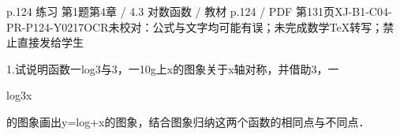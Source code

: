 \begin{bankitem}{p.124 练习 第1题}{第4章 / 4.3 对数函数 / 教材 p.124 / PDF 第131页}{XJ-B1-C04-PR-P124-Y0217}{OCR未校对：公式与文字均可能有误；未完成数学TeX转写；禁止直接发给学生}
\begin{ocrdraft}
\par
1.试说明函数一log3与3，一10g上x的图象关于x轴对称，并借助3，一
\par
{}log3x
\par
的图象画出y=log+x的图象，结合图象归纳这两个函数的相同点与不同点．
\end{ocrdraft}
\end{bankitem}
